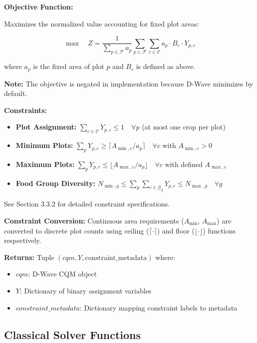\documentclass{article}
\begin{document}
\textbf{Objective Function:}

Maximizes the normalized value accounting for fixed plot areas:

$$\max \quad Z = \frac{1}{\sum_{p \in \mathcal{F}} a_p} \sum_{p \in \mathcal{F}} \sum_{c \in \mathcal{C}} a_p \cdot B_c \cdot Y_{p,c}$$

where $a_p$ is the fixed area of plot $p$ and $B_c$ is defined as above.

\textbf{Note:} The objective is negated in implementation because D-Wave minimizes by default.

\textbf{Constraints:}

\begin{itemize}
    \item \textbf{Plot Assignment:} $\sum_{c \in \mathcal{C}} Y_{p,c} \leq 1 \quad \forall p$ (at most one crop per plot)
    \item \textbf{Minimum Plots:} $\sum_{p} Y_{p,c} \geq \lceil A_{\min,c}/a_p \rceil \quad \forall c$ with $A_{\min,c} > 0$
    \item \textbf{Maximum Plots:} $\sum_{p} Y_{p,c} \leq \lfloor A_{\max,c}/a_p \rfloor \quad \forall c$ with defined $A_{\max,c}$
    \item \textbf{Food Group Diversity:} $N_{\min,g} \leq \sum_{p}\sum_{c \in \mathcal{G}_g} Y_{p,c} \leq N_{\max,g} \quad \forall g$
\end{itemize}

See Section 3.3.2 for detailed constraint specifications.

\textbf{Constraint Conversion:} Continuous area requirements ($A_{\min}$, $A_{\max}$) are converted to discrete plot counts using ceiling ($\lceil \cdot \rceil$) and floor ($\lfloor \cdot \rfloor$) functions respectively.

\textbf{Returns:} Tuple $(cqm, Y, \text{constraint\_metadata})$ where:
\begin{itemize}
    \item $cqm$: D-Wave CQM object
    \item $Y$: Dictionary of binary assignment variables
    \item $constraint\_metadata$: Dictionary mapping constraint labels to metadata
\end{itemize}

\subsection{Classical Solver Functions}
\end{document}
